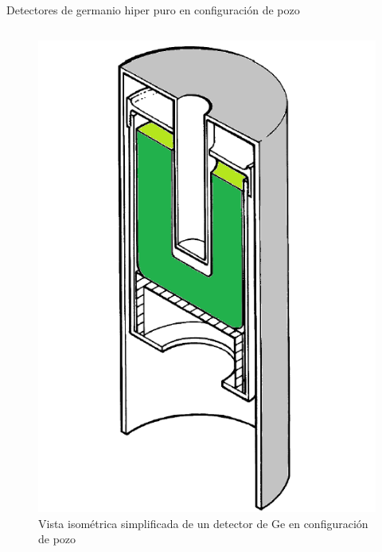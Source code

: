 \documentclass[9pt]{beamer}
\begin{document}
\begin{frame}{Detectores de germanio hiper puro en configuración de pozo}
\begin{columns}
\begin{column}{0.28\textwidth}
\begin{figure}
			\includegraphics[width=1\textwidth]{Imagenes/WellDetectorSimply-2.png}
			\caption{\justifying Vista isométrica simplificada de un detector de Ge en configuración de pozo\footnotemark[2]}
			\end{figure}
		\end{column}
	\end{columns}
\end{frame}
\end{document}
